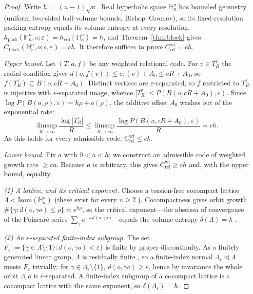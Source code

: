 \documentclass[11pt,reqno]{amsart}
\theoremstyle{plain}
\theoremstyle{definition}
\newcommand{\hpack}{h_{\mathrm{pack}}}
\newcommand{\hvol}{h_{\mathrm{vol}}}
\newcommand{\Crel}{C_{\mathrm{rel}}}
\newcommand{\Cblock}{C_{\mathrm{block}}}
\newcommand{\Hk}{\mathbb{H}^n_\kappa}
\newcommand{\eps}{\varepsilon}
\begin{document}
\begin{proof}
Write $h:=(n-1)\sqrt\kappa$. Real hyperbolic space $\Hk$ has bounded geometry (uniform two-sided ball-volume bounds, Bishop--Gromov), so its fixed-resolution packing entropy equals its volume entropy at every resolution, $\hpack(\Hk,o;\eps)=\hvol(\Hk)=h$, and Theorem~\ref{thm:block} gives $\Cblock(\Hk,o;c,\eps)=ch$. It therefore suffices to prove $\Crel^{\mathrm{wt}}=ch$.

\smallskip
\noindent\emph{Upper bound.} Let $(T,a,f)$ be any weighted relational code. For $v\in T_R^\tau$ the radial condition gives $d(o,f(v))\le c\tau(v)+A_0\le cR+A_0$, so $f(T_R^\tau)\subseteq B(o,cR+A_0)$. Distinct vertices are $\eps$-separated, so $f$ restricted to $T_R^\tau$ is injective with $\eps$-separated image, whence $|T_R^\tau|\le P(B(o,cR+A_0),\eps)$. Since $\log P(B(o,\rho),\eps)=h\rho+o(\rho)$, the additive offset $A_0$ washes out of the exponential rate:
\[
\limsup_{R\to\infty}\frac{\log|T_R^\tau|}{R}\le\limsup_{R\to\infty}\frac{\log P(B(o,cR+A_0),\eps)}{R}=ch.
\]
As this holds for every admissible code, $\Crel^{\mathrm{wt}}\le ch$.

\smallskip
\noindent\emph{Lower bound.} Fix $a$ with $0<a<h$; we construct an admissible code of weighted growth rate $\ge ca$. Because $a$ is arbitrary, this gives $\Crel^{\mathrm{wt}}\ge ch$ and, with the upper bound, equality.

\emph{(1) A lattice, and its critical exponent.} Choose a torsion-free cocompact lattice $\Lambda<\mathrm{Isom}(\Hk)$ (these exist for every $n\ge2$ \cite{borel1963}). Cocompactness gives orbit growth $\#\{\gamma:d(o,\gamma o)\le\rho\}\asymp e^{h\rho}$, so the critical exponent---the abscissa of convergence of the Poincar\'e series $\sum_\gamma e^{-s\,d(o,\gamma o)}$---equals the volume entropy $\delta(\Lambda)=h$ \cite{patterson1976,sullivan1979}.

\emph{(2) An $\eps$-separated finite-index subgroup.} The set $F_\eps:=\{\gamma\in\Lambda\setminus\{1\}:d(o,\gamma o)<\eps\}$ is finite by proper discontinuity. As a finitely generated linear group, $\Lambda$ is residually finite \cite{malcev1940}, so a finite-index normal $\Lambda_\eps\triangleleft\Lambda$ meets $F_\eps$ trivially: for $\gamma\in\Lambda_\eps\setminus\{1\}$, $d(o,\gamma o)\ge\eps$, hence by invariance the whole orbit $\Lambda_\eps o$ is $\eps$-separated. A finite-index subgroup of a cocompact lattice is a cocompact lattice with the same exponent, so $\delta(\Lambda_\eps)=h$.


\end{proof}
\end{document}
